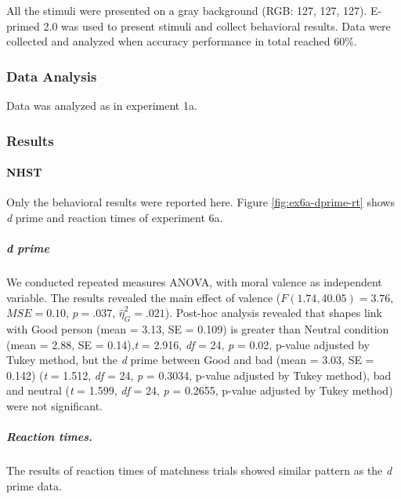 \documentclass[
  english,
  man]{apa6}
\let\oldparagraph\paragraph
\renewcommand{\paragraph}[1]{\oldparagraph{#1}\mbox{}}
\let\oldsubparagraph\subparagraph
\renewcommand{\subparagraph}[1]{\oldsubparagraph{#1}\mbox{}}
\begin{document}
All the stimuli were presented on a gray background (RGB: 127, 127, 127). E-primed 2.0 was used to present stimuli and collect behavioral results. Data were collected and analyzed when accuracy performance in total reached 60\%.

\hypertarget{data-analysis-5}{%
\subsubsection{Data Analysis}\label{data-analysis-5}}

Data was analyzed as in experiment 1a.

\hypertarget{results-4}{%
\subsubsection{Results}\label{results-4}}

\hypertarget{nhst-2}{%
\paragraph{NHST}\label{nhst-2}}

Only the behavioral results were reported here. Figure \ref{fig:ex6a-dprime-rt} shows \emph{d} prime and reaction times of experiment 6a.

\hypertarget{d-prime-2}{%
\subparagraph{d prime}\label{d-prime-2}}

We conducted repeated measures ANOVA, with moral valence as independent variable. The results revealed the main effect of valence (\(F(1.74, 40.05) = 3.76\), \(\mathit{MSE} = 0.10\), \(p = .037\), \(\hat{\eta}^2_G = .021\)). Post-hoc analysis revealed that shapes link with Good person (mean = 3.13, SE = 0.109) is greater than Neutral condition (mean = 2.88, SE = 0.14),\emph{t} = 2.916, \emph{df} = 24, \emph{p} = 0.02, p-value adjusted by Tukey method, but the \emph{d} prime between Good and bad (mean = 3.03, SE = 0.142) (\emph{t} = 1.512, \emph{df} = 24, \emph{p} = 0.3034, p-value adjusted by Tukey method), bad and neutral (\emph{t} = 1.599, \emph{df} = 24, \emph{p} = 0.2655, p-value adjusted by Tukey method) were not significant.

\hypertarget{reaction-times.}{%
\subparagraph{Reaction times.}\label{reaction-times.}}

The results of reaction times of matchness trials showed similar pattern as the \emph{d} prime data.
\end{document}
